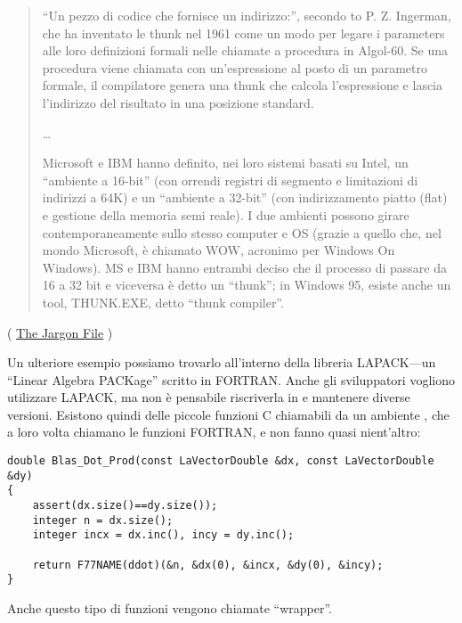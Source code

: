 \begin{framed}
\begin{quotation}
“Un pezzo di codice che fornisce un indirizzo:”, secondo to P. Z. Ingerman,
che ha inventato le thunk nel 1961 come un modo per legare i parameters alle loro definizioni formali
nelle chiamate a procedura in Algol-60. Se una procedura viene chiamata con un'espressione al posto di un parametro formale,
il compilatore genera una thunk che calcola l'espressione e lascia l'indirizzo del risultato in una posizione standard.

\dots

Microsoft e IBM hanno definito, nei loro sistemi basati su Intel, un “ambiente a 16-bit”
(con orrendi registri di segmento e limitazioni di indirizzi a 64K) e un “ambiente a 32-bit”
(con indirizzamento piatto (flat) e gestione della memoria semi reale). I due ambienti possono girare contemporaneamente
sullo stesso computer e OS (grazie a quello che, nel mondo Microsoft, è chiamato WOW, acronimo per Windows On Windows).
MS e IBM hanno entrambi deciso che il processo di passare da 16 a 32 bit e viceversa è detto un “thunk”; in Windows 95,
esiste anche un tool, THUNK.EXE, detto “thunk compiler”.
\end{quotation}
\end{framed}
( \href{http://go.yurichev.com/17362}{The Jargon File} )

Un ulteriore esempio possiamo trovarlo all'interno della libreria LAPACK---un ``Linear Algebra PACKage'' scritto in FORTRAN.
Anche gli sviluppatori \CCpp vogliono utilizzare LAPACK, ma non è pensabile riscriverla in \CCpp e mantenere diverse versioni.
Esistono quindi delle piccole funzioni C chiamabili da un ambiente \CCpp, che a loro volta chiamano le funzioni FORTRAN,
e non fanno quasi nient'altro:

\begin{lstlisting}[style=customc]
double Blas_Dot_Prod(const LaVectorDouble &dx, const LaVectorDouble &dy)
{
    assert(dx.size()==dy.size());
    integer n = dx.size();
    integer incx = dx.inc(), incy = dy.inc();

    return F77NAME(ddot)(&n, &dx(0), &incx, &dy(0), &incy);
}
\end{lstlisting}

Anche questo tipo di funzioni vengono chiamate ``wrapper''.
